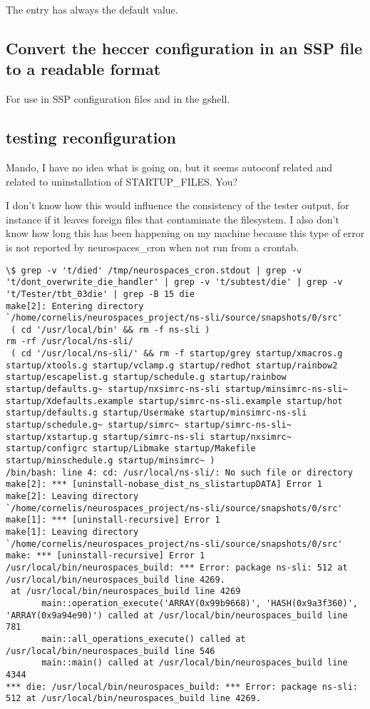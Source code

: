 \documentclass[12pt]{article}
\begin{document}
The entry has always the default value.


\subsection{Convert the heccer configuration in an SSP file to a readable format}

For use in SSP configuration files and in the gshell.


\subsection{testing reconfiguration}

Mando, I have no idea what is going on, but it seems autoconf related
and related to uninstallation of STARTUP\_FILES.  You?

I don't know how this would influence the consistency of the tester
output, for instance if it leaves foreign files that contaminate the
filesystem.  I also don't know how long this has been happening on my
machine because this type of error is not reported by
neurospaces\_cron when not run from a crontab.

\begin{verbatim}
\$ grep -v 't/died' /tmp/neurospaces_cron.stdout | grep -v 't/dont_overwrite_die_handler' | grep -v 't/subtest/die' | grep -v 't/Tester/tbt_03die' | grep -B 15 die
make[2]: Entering directory
`/home/cornelis/neurospaces_project/ns-sli/source/snapshots/0/src'
 ( cd '/usr/local/bin' && rm -f ns-sli )
rm -rf /usr/local/ns-sli/
 ( cd '/usr/local/ns-sli/' && rm -f startup/grey startup/xmacros.g startup/xtools.g startup/vclamp.g startup/redhot startup/rainbow2 startup/escapelist.g startup/schedule.g startup/rainbow startup/defaults.g~ startup/nxsimrc-ns-sli startup/minsimrc-ns-sli~ startup/Xdefaults.example startup/simrc-ns-sli.example startup/hot startup/defaults.g startup/Usermake startup/minsimrc-ns-sli startup/schedule.g~ startup/simrc~ startup/simrc-ns-sli~ startup/xstartup.g startup/simrc-ns-sli startup/nxsimrc~ startup/configrc startup/Libmake startup/Makefile startup/minschedule.g startup/minsimrc~ )
/bin/bash: line 4: cd: /usr/local/ns-sli/: No such file or directory
make[2]: *** [uninstall-nobase_dist_ns_slistartupDATA] Error 1
make[2]: Leaving directory
`/home/cornelis/neurospaces_project/ns-sli/source/snapshots/0/src'
make[1]: *** [uninstall-recursive] Error 1
make[1]: Leaving directory
`/home/cornelis/neurospaces_project/ns-sli/source/snapshots/0/src'
make: *** [uninstall-recursive] Error 1
/usr/local/bin/neurospaces_build: *** Error: package ns-sli: 512 at
/usr/local/bin/neurospaces_build line 4269.
 at /usr/local/bin/neurospaces_build line 4269
       main::operation_execute('ARRAY(0x99b9668)', 'HASH(0x9a3f360)',
'ARRAY(0x9a94e90)') called at /usr/local/bin/neurospaces_build line
781
       main::all_operations_execute() called at
/usr/local/bin/neurospaces_build line 546
       main::main() called at /usr/local/bin/neurospaces_build line 4344
*** die: /usr/local/bin/neurospaces_build: *** Error: package ns-sli:
512 at /usr/local/bin/neurospaces_build line 4269.

\end{verbatim}
\end{document}
